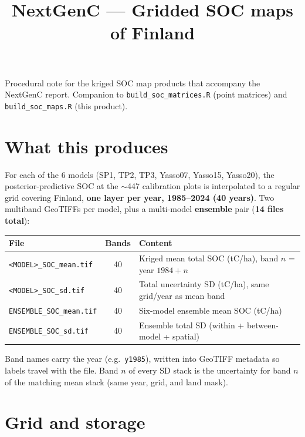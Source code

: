 \documentclass[11pt]{article}
\title{\vspace{-1.4cm}\textbf{NextGenC --- Gridded SOC maps of Finland}}
\author{}
\date{}
\newcommand{\code}[1]{\texttt{\small #1}}
\begin{document}
\maketitle
\vspace{-2.2em}

Procedural note for the kriged SOC map products that accompany the NextGenC
report. Companion to \code{build\_soc\_matrices.R} (point matrices) and
\code{build\_soc\_maps.R} (this product).

\section{What this produces}

For each of the 6 models (SP1, TP2, TP3, Yasso07, Yasso15, Yasso20), the
posterior-predictive SOC at the $\sim$447 calibration plots is interpolated to
a regular grid covering Finland, \textbf{one layer per year, 1985--2024
(40 years)}. Two multiband GeoTIFFs per model, plus a multi-model
\textbf{ensemble} pair (\textbf{14 files total}):

\begin{center}
\begin{tabular}{@{}lcl@{}}
\toprule
\textbf{File} & \textbf{Bands} & \textbf{Content} \\
\midrule
\code{<MODEL>\_SOC\_mean.tif} & 40 & Kriged mean total SOC (tC/ha), band $n$ = year $1984{+}n$ \\
\code{<MODEL>\_SOC\_sd.tif}   & 40 & Total uncertainty SD (tC/ha), same grid/year as mean band \\
\code{ENSEMBLE\_SOC\_mean.tif} & 40 & Six-model ensemble mean SOC (tC/ha) \\
\code{ENSEMBLE\_SOC\_sd.tif}   & 40 & Ensemble total SD (within + between-model + spatial) \\
\bottomrule
\end{tabular}
\end{center}

Band names carry the year (e.g.\ \code{y1985}), written into GeoTIFF metadata so
labels travel with the file. Band $n$ of every SD stack is the uncertainty for
band $n$ of the matching mean stack (same year, grid, and land mask).

\section{Grid and storage}
\end{document}
